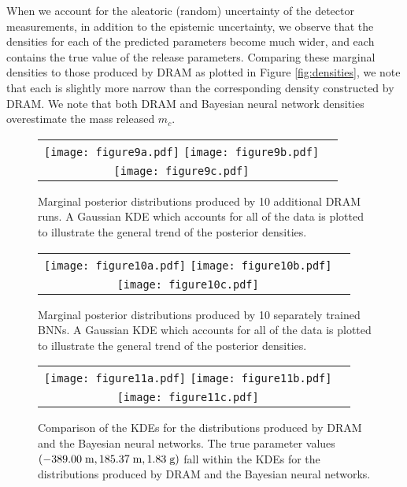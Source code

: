 \documentclass[sn-mathphys-ay]{sn-jnl}
\begin{document}
 When we account for the aleatoric (random) uncertainty of the detector measurements, in addition to the epistemic uncertainty, we observe that the densities for each of the predicted parameters become much wider, and each contains the true value of the release parameters. Comparing these marginal densities to those produced by DRAM as plotted in Figure \ref{fig:densities}, we note that each is slightly more narrow than the corresponding density constructed by DRAM. We note that both DRAM and Bayesian neural network densities overestimate the mass released $m_c$.

 \begin{figure}[!ht]
 \centering
 \begin{tabular}{c c}
    \texttt{[image: figure9a.pdf]}
    \texttt{[image: figure9b.pdf]}\\   \texttt{[image: figure9c.pdf]}
    \end{tabular}
\caption{Marginal posterior distributions produced by 10 additional DRAM runs. A Gaussian KDE which accounts for all of the data is plotted to illustrate the general trend of the posterior densities.}
\label{fig:DRAM_statistics}
 \end{figure}

 \begin{figure}[!ht]
 \centering
 \begin{tabular}{c c}
    \texttt{[image: figure10a.pdf]}
    \texttt{[image: figure10b.pdf]}\\
    \texttt{[image: figure10c.pdf]}
    \end{tabular}
\caption{Marginal posterior distributions produced by 10 separately trained BNNs. A Gaussian KDE which accounts for all of the data is plotted to illustrate the general trend of the posterior densities.}
\label{fig:BNN_statistics}
 \end{figure}

\begin{figure}[!ht]
 \centering
 \begin{tabular}{c c}
    \texttt{[image: figure11a.pdf]}
    \texttt{[image: figure11b.pdf]}\\
    \texttt{[image: figure11c.pdf]}
    \end{tabular}
\caption{Comparison of the KDEs for the distributions produced by DRAM and the Bayesian neural networks. The true parameter values $(-389.00 \hspace{1mm} \text{m}, 185.37 \hspace{1mm} \text{m}, 1.83 \hspace{1mm} \text{g})$ fall within the KDEs for the distributions produced by DRAM and the Bayesian neural networks.}
\label{fig:BNN_DRAM_comparison}
 \end{figure}
\end{document}
